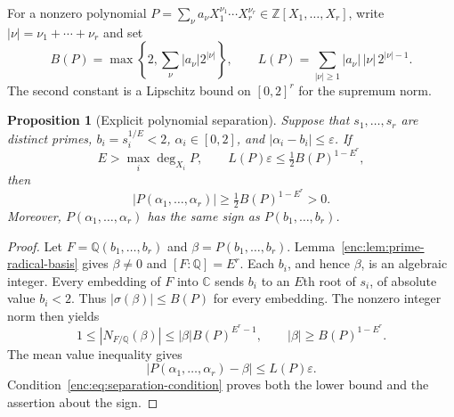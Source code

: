 \documentclass[11pt,a4paper]{article}
\newtheorem{proposition}[theorem]{Proposition}
\theoremstyle{definition}
\theoremstyle{remark}
\numberwithin{equation}{section}
\begin{document}
For a nonzero polynomial
$P=\sum_{\nu}a_{\nu}X_1^{\nu_1}\cdots X_r^{\nu_r}
\in\mathbb Z[X_1,\ldots,X_r]$, write $|\nu|=\nu_1+\cdots+\nu_r$ and set
\begin{equation}
\label{enc:eq:polynomial-constants}
 B(P)=\max\left\{2,\sum_{\nu}|a_{\nu}|2^{|\nu|}\right\},
 \qquad
 L(P)=\sum_{|\nu|\ge1}|a_{\nu}|\,|\nu|\,2^{|\nu|-1}.
\end{equation}
The second constant is a Lipschitz bound on $[0,2]^r$ for the supremum norm.

\begin{proposition}[Explicit polynomial separation]
\label{enc:prop:polynomial-separation}
Suppose that $s_1,\ldots,s_r$ are distinct primes,
$b_i=s_i^{1/E}<2$, $\alpha_i\in[0,2]$, and
$|\alpha_i-b_i|\le\varepsilon$.  If
\begin{equation}
\label{enc:eq:separation-condition}
 E>\max_i\deg_{X_i}P,
 \qquad
 L(P)\varepsilon\le\tfrac12 B(P)^{1-E^r},
\end{equation}
then
\begin{equation}
\label{enc:eq:separation-conclusion}
 |P(\alpha_1,\ldots,\alpha_r)|
 \ge\tfrac12 B(P)^{1-E^r}>0.
\end{equation}
Moreover, $P(\alpha_1,\ldots,\alpha_r)$ has the same sign as
$P(b_1,\ldots,b_r)$.
\end{proposition}

\begin{proof}
Let $F=\mathbb Q(b_1,\ldots,b_r)$ and
$\beta=P(b_1,\ldots,b_r)$.  Lemma~\ref{enc:lem:prime-radical-basis} gives
$\beta\ne0$ and $[F:\mathbb Q]=E^r$.  Each $b_i$, and hence $\beta$, is an
algebraic integer.  Every embedding of $F$ into $\mathbb C$ sends $b_i$ to
an $E$th root of $s_i$, of absolute value $b_i<2$.  Thus
$|\sigma(\beta)|\le B(P)$ for every embedding.  The nonzero integer norm
then yields
\[
 1\le|N_{F/\mathbb Q}(\beta)|
 \le|\beta|B(P)^{E^r-1},
 \qquad |\beta|\ge B(P)^{1-E^r}.
\]
The mean value inequality gives
\[
 |P(\alpha_1,\ldots,\alpha_r)-\beta|\le L(P)\varepsilon.
\]
Condition~\eqref{enc:eq:separation-condition} proves both the lower bound and
the assertion about the sign.
\end{proof}
\end{document}
